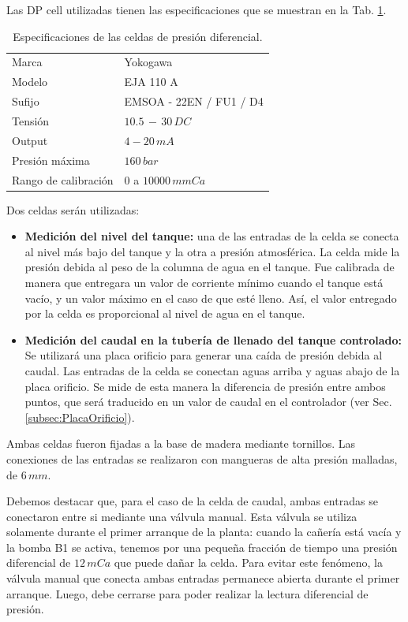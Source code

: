 Las DP cell utilizadas tienen las especificaciones que se muestran en la Tab.
\ref{tab:caractDPcell}.

\begin{table}
\centering
\begin{tabular}{|l|l|}
\hline
Marca & Yokogawa\\
Modelo & EJA 110 A\\
Sufijo & EMSOA - 22EN / FU1 / D4\\
Tensión & $10.5\,-\,30 \, DC$\\
Output & $4-20\,mA$\\
Presión máxima & $160\,bar$\\
Rango de calibración & $0$ a $10000\,mmCa$\\
\hline
\end{tabular}
\caption{Especificaciones de las celdas de presión diferencial.}
\label{tab:caractDPcell}
\end{table}

Dos celdas serán utilizadas:
\begin{itemize}
 \item \textbf{Medición del nivel del tanque:} una de las entradas de la celda
se conecta  al nivel más bajo del tanque y la otra a presión atmosférica.
La celda mide la presión debida al peso  de la columna de agua en el tanque.
Fue calibrada de manera que entregara un valor de corriente mínimo
cuando el tanque está vacío, y un valor máximo en el caso de que esté
lleno.
Así, el valor entregado por la celda es proporcional al nivel de
agua en el tanque.

\item \textbf{Medición del caudal en la tubería de llenado del tanque
controlado:}
Se utilizará una placa orificio para generar una caída de presión debida al
caudal.
Las entradas de la celda se conectan aguas arriba y aguas abajo
de la placa orificio.
Se mide de esta manera la diferencia de presión entre ambos puntos, que será
traducido en un valor de caudal en el
controlador (ver Sec. \ref{subsec:PlacaOrificio}).
\end{itemize}

Ambas celdas fueron fijadas a la base de madera mediante tornillos.
Las conexiones de las entradas se realizaron con mangueras de alta presión
malladas, de $6\,mm$.

Debemos destacar que, para el caso de la celda de caudal, ambas
entradas se conectaron entre si mediante una válvula manual.
Esta válvula se utiliza solamente durante el primer arranque de la planta:
cuando la cañería está vacía y la bomba B1 se activa, tenemos por una pequeña
fracción de tiempo una presión diferencial de $12\,mCa$ que puede dañar la
celda.
Para evitar este fenómeno, la válvula manual que conecta ambas entradas
permanece abierta durante el primer arranque.
Luego, debe cerrarse para poder realizar la lectura diferencial de presión.

